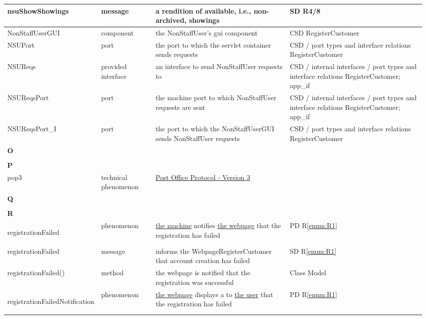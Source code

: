 \documentclass[a4paper,10pt,titlepage,bibtotoc,bibtotocnumbered]{scrreprt}
\begin{document}
\begin{longtable}{|p{.4\linewidth}|p{.2\linewidth}|p{.2\linewidth}|p{.2\linewidth}|}
\hline
nsuShowShowings & message & a rendition of available, i.e., non-archived, showings & SD R4/8\\
\hline
NonStaffUserGUI & component & the NonStaffUser's gui component & CSD RegisterCustomer\\
\hline
NSUPort & port & the port to which the servlet container sends requests & CSD / port types and interface relations RegisterCustomer\\
\hline
NSUReqs & provided interface & an interface to send NonStaffUser requests to & CSD / internal interfaces / port types and interface relations RegisterCustomer; app\_if\\
\hline
NSUReqsPort & port & the machine port to which NonStaffUser requests are sent & CSD / internal interfaces / port types and interface relations RegisterCustomer; app\_if\\
\hline
NSUReqsPort\_I & port & the port to which the NonStaffUserGUI sends NonStaffUser requests & CSD / port types and interface relations RegisterCustomer\\
\hline
\hline
\multicolumn{4}{|l|}{\textbf{O}}\\
\hline
&  &  & \\
\hline
\multicolumn{4}{|l|}{\textbf{P}}\\
\hline
pop3 & technical phenomenon & \hyperlink{tools.ietf.org/html/rfc1939}{Post Office Protocol - Version 3} & \\
\hline
\multicolumn{4}{|l|}{\textbf{Q}}\\
\hline
&  &  & \\
\hline
\multicolumn{4}{|l|}{\textbf{R}}\\
\hline
\hypertarget{glossary:registrationFailed}{registrationFailed} & phenomenon & \hyperlink{glossary:UDEKino}{the machine} notifies \hyperlink{glossary:WebpageRegisterCustomer}{the webpage} that the registration has failed & PD R\ref{enum:R1}\\
\hline
registrationFailed & message & informs the WebpageRegisterCustomer that account creation has failed & SD R\ref{enum:R1}\\
\hline
registrationFailed() & method & the webpage is notified that the registration was successful & Class Model\\
\hline
\hypertarget{glossary:registrationFailedNotification}{registrationFailedNotification} & phenomenon & \hyperlink{glossary:WebpageRegisterCustomer}{the webpage} displays a to \hyperlink{glossary:User}{the user} that the registration has failed & PD R\ref{enum:R1}\\

\end{longtable}
\end{document}
